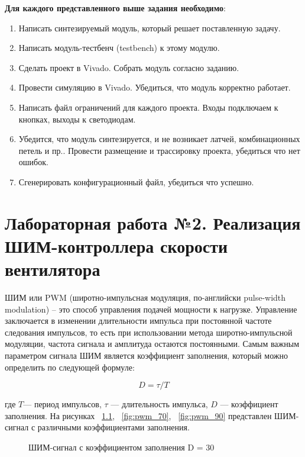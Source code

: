 \documentclass[a4paper,oneside ,14pt]{extreport}
\begin{document}
\textbf{Для каждого представленного выше задания необходимо}:
\begin{enumerate}
\item Написать синтезируемый модуль, который решает поставленную задачу.
\item Написать модуль-тестбенч (testbench) к этому модулю.
\item Сделать проект в Vivado. Собрать модуль согласно заданию. 
\item Провести симуляцию в Vivado. Убедиться, что модуль корректно работает.
\item Написать файл ограничений для каждого проекта. Входы подключаем к кнопках, выходы к светодиодам.
\item Убедится, что модуль синтезируется, и не возникает латчей, комбинационных петель и пр.. Провести размещение и трассировку проекта, убедиться что нет ошибок. 
\item Сгенерировать конфигурационный файл, убедиться что успешно.
\end{enumerate}

\chapter{Лабораторная работа №2. Реализация ШИМ-контроллера скорости вентилятора}

ШИМ или PWM (широтно-импульсная модуляция, по-английски pulse-width modulation) – это
способ управления подачей мощности к нагрузке. Управление заключается в изменении
длительности импульса при постоянной частоте следования импульсов, то есть при использовании метода широтно-импульсной модуляции, 
частота сигнала и амплитуда остаются постоянными. 
Самым важным параметром сигнала ШИМ является коэффициент заполнения, 
который можно определить по следующей формуле:

\begin{equation}	
	D =  \tau/T
\end{equation}

где \(T\)— период импульсов, \(\tau\)  — длительность импульса, \(D\) — коэффициент заполнения. На рисунках ~\ref{fig:pwm_30}, ~\ref{fig:pwm_70}, ~\ref{fig:pwm_90} представлен ШИМ-сигнал
с различными коэффициентами заполнения.

\begin{figure}[h]
    \centering
    \noindent
    \caption{ШИМ-сигнал с коэффициентом заполнения D = 30}
    \label{fig:pwm_30}
\end{figure}
\end{document}
